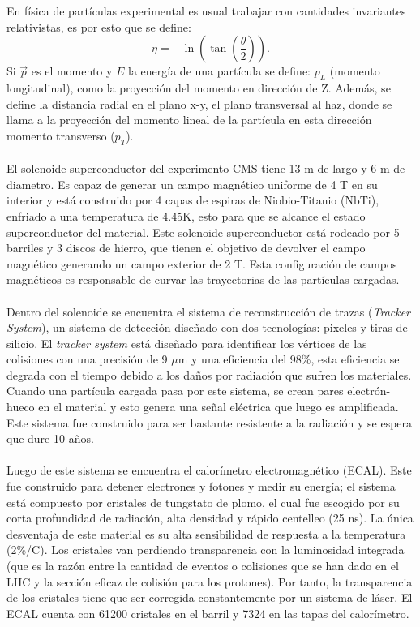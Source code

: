 En física de partículas experimental es usual trabajar con cantidades invariantes relativistas, es por esto que se define:
\begin{equation}
	\eta=-\ln\left(\tan\left(\frac{\theta}{2}\right) \right).
\end{equation} 	
Si $\vec{p}$ es el momento y $E$ la energía de una partícula se define: $p_L$ (momento longitudinal), como la proyección del momento en dirección de Z. Además, se define la distancia radial en el plano x-y, el plano transversal al haz, donde se llama a la proyección del momento lineal de la partícula en esta dirección momento transverso ($p_T$).  
\\
\\
El solenoide superconductor del experimento CMS tiene 13 m de largo y 6 m de diametro. Es capaz de generar un campo magnético uniforme de 4 T en su interior y está construido por 4 capas de espiras de Niobio-Titanio (NbTi), enfriado a una temperatura de 4.45K, esto para que se alcance el estado superconductor del material. Este solenoide superconductor está rodeado por 5 barriles y 3 discos de hierro, que tienen el objetivo de devolver el campo magnético generando un campo exterior de 2 T.  Esta configuración de campos magnéticos es responsable de curvar las trayectorias de las partículas cargadas.
\\
\\
Dentro del solenoide se encuentra el sistema de reconstrucción de trazas (\textit{Tracker System}), un sistema de detección diseñado con dos tecnologías: pixeles y tiras de silicio. El \textit{tracker system} está diseñado para identificar los vértices de las colisiones con una precisión de 9 $\mu$m y una eficiencia del 98\%, esta eficiencia se degrada con el tiempo debido a los daños por radiación que sufren los materiales. Cuando una partícula cargada pasa por este sistema, se crean pares electrón-hueco en el material y esto genera una señal eléctrica que luego es amplificada. Este sistema fue construido para ser bastante resistente a la radiación y se espera que dure 10 años.
\\
\\
Luego de este sistema se encuentra el calorímetro electromagnético (ECAL). Este fue construido para detener electrones y fotones y medir su energía; el sistema está compuesto por cristales de tungstato de plomo, el cual fue escogido por su corta profundidad de radiación, alta densidad y rápido centelleo (25 ns). La única desventaja de este material es su alta sensibilidad de respuesta a la temperatura (2\%/C). Los cristales van perdiendo transparencia con la luminosidad integrada (que es la razón entre la cantidad de eventos o colisiones que se han dado en el LHC y la sección eficaz de colisión para los protones\cite{RuizAlvarez:2016mhn}). Por tanto, la transparencia de los cristales tiene que ser corregida constantemente por un sistema de láser. El ECAL cuenta con 61200 cristales en el barril y 7324 en las tapas del calorímetro.
